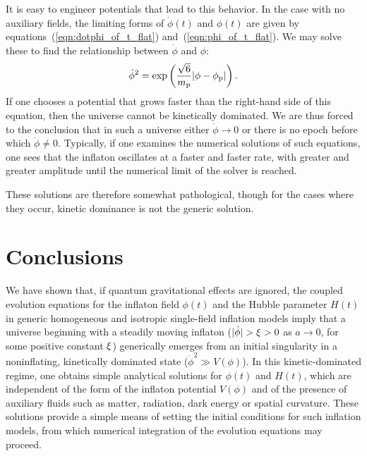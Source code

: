 It is easy to engineer potentials that lead to this behavior. In the case with no auxiliary fields, the limiting forms of $\dot{\phi}(t)$ and $\phi(t)$ are given by equations~(\ref{eqn:dotphi_of_t_flat}) and~(\ref{eqn:phi_of_t_flat}). We may solve these to find the relationship between $\dot{\phi}$ and $\phi$:
%
\begin{equation}
  \dot{\phi}^2 = \exp\left(\frac{\sqrt{6}}{m_{\mathrm{p}}} |\phi-\phi_{\mathrm{p}}|\right).
\end{equation}
%
If one chooses a potential that grows faster than the right-hand side of this equation, then the universe cannot be kinetically dominated.  We are thus forced to the conclusion that in such a universe either $\dot{\phi}\to 0$ or there is no epoch before which $\dot{\phi}\ne 0$.  Typically, if one examines the numerical solutions of such equations, one sees that the inflaton oscillates at a faster and faster rate, with greater and greater amplitude until the numerical limit of the solver is reached.

These solutions are therefore somewhat pathological, though for the cases where they occur, kinetic dominance is not the generic solution.









\section{Conclusions}
\label{sec:Conclusions}

We have shown that, if quantum gravitational effects are ignored, the coupled evolution equations for the inflaton field $\phi(t)$ and the Hubble parameter $H(t)$ in generic homogeneous and isotropic single-field inflation models imply that a universe beginning with a steadily moving inflaton ($|\dot{\phi}| > \xi > 0$ as $a\to 0$, for some positive constant $\xi$) generically emerges from an initial singularity in a noninflating, kinetically dominated state ($\dot{\phi}^2 \gg V(\phi)$).  In this kinetic-dominated regime, one obtains simple analytical solutions for $\phi(t)$ and $H(t)$, which are independent of the form of the inflaton potential $V(\phi)$ and of the presence of auxiliary fluids such as matter, radiation, dark energy or spatial curvature. These solutions provide a simple means of setting the initial conditions for such inflation models, from which numerical integration of the evolution equations may proceed.

